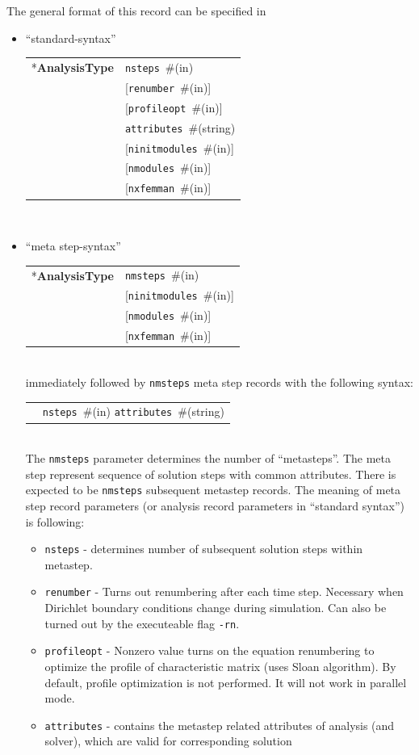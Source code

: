 \documentclass[a4paper]{article}
\makeatletter
\newcommand{\param}[1]{\texttt{#1}} %
\newcommand{\optional}[1]{[#1]} %
\newcommand{\field}[2]{\param{#1}~\#{\tiny(#2)}} %
\newcommand{\optField}[2]{\optional{\field{#1}{#2}}}
\newcommand{\entKeyword}[1]{*\textbf{#1}} %
\newenvironment{record}[1][]{\begin{tabular}{|ll}}{\end{tabular}\\}
\newcommand{\recentry}[2]{{#1}&{#2}\\}
\newcounter{rcc}
\newenvironment{record}[1][\textwidth]{\setcounter{rcc}{0}\begin{tabular*}{#1}{|ll@{\extracolsep{\fill}}r}}{\end{tabular*}\\}
\newcommand{\recentry}[2]{\ifthenelse{\value{rcc}>0}{&$\backslash$ \\}{\setcounter{rcc}{1}}{#1}&{#2}}
\makeatother
\begin{document}
The general format of this record can be specified in
\begin{itemize}
\item ``standard-syntax''\\
  \begin{record}[0.9\textwidth]
    \recentry{\entKeyword{AnalysisType}}{\field{nsteps}{in}}
    \recentry{}{\optField{renumber}{in}}
    \recentry{}{\optField{profileopt}{in}}
    \recentry{}{\field{attributes}{string}}
    \recentry{}{\optField{ninitmodules}{in}}
    \recentry{}{\optField{nmodules}{in}}
    \recentry{}{\optField{nxfemman}{in}}
  \end{record}
\item ``meta step-syntax''\\
  \begin{record}[0.9\textwidth]
    \recentry{\entKeyword{AnalysisType}}{\field{nmsteps}{in}}
    \recentry{}{\optField{ninitmodules}{in}}
    \recentry{}{\optField{nmodules}{in}}
    \recentry{}{\optField{nxfemman}{in}}
  \end{record}
  immediately followed by \param{nmsteps} meta step records with the following syntax:\\
  \begin{record}[0.9\textwidth]
    \recentry{}{\field{nsteps}{in} \field{attributes}{string}}
  \end{record}
  The \param{nmsteps} parameter determines the number of ``metasteps''. The
meta step represent sequence of solution steps with common attributes.
There is expected to be \param{nmsteps} subsequent metastep records.
The meaning of meta step record parameters (or analysis record
parameters in ``standard syntax'') is following:
\begin{itemize}
\item \param{nsteps} - determines number of subsequent solution steps
within me\-ta\-step.
\item \param{renumber} - Turns out renumbering after each time step.
Necessary when Dirichlet boundary conditions change during simulation.
Can also be turned out by the executeable flag \texttt{-rn}.
\item \param{profileopt} - Nonzero value turns on the
equation renumbering to optimize the profile of characteristic matrix
(uses Sloan algorithm). By default, profile optimization is not
performed. It will not work in parallel mode.
\item \param{attributes} - contains the metastep related attributes of
analysis (and solver), which are valid for corresponding solution

\end{itemize}
\end{itemize}
\end{document}
